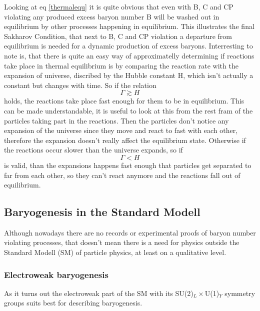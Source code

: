 Looking at eq \ref{thermalequ} it is quite obvious that even with B, C and CP violating any produced excess baryon number B will be washed out in equilibrium by other processes happening in equilibrium. \newline
This illustrates the final Sakharov Condition, that next to B, C and CP violation a departure from equilibrium is needed for a dynamic production of excess baryons. \newline
Interresting to note is, that there is quite an easy way of approximatelly determining if reactions take place in thermal equilibrium is by comparing the reaction rate with the expansion of universe, discribed by the Hubble constant H, which isn't actually a constant but changes with time. So if the relation 
\begin{equation}
	\Gamma\gtrsim H
	\label{rate_g_hubble}
\end{equation}
holds, the reactions take place fast enough for them to be in equilibrium. This can be made understandable, it is useful to look at this from the rest fram of the particles taking part in the reactions. Then the particles don't notice any expansion of the universe since they move and react to fast with each other, therefore the expansion doesn't really affect the equilibrium state. \newline
Otherwise if the reactions occur slower than the universe expands, so if 
\begin{equation}
	\Gamma<H
\end{equation}
is valid, than the expansions happens fast enough that particles get separated to far from each other, so they can't react anymore and the reactions fall out of equilibrium.
\subsection{Baryogenesis in the Standard Modell}
Although nowadays there are no records or experimental proofs of baryon number violating processes, that doesn't mean there is a need for physics outside the Standard Modell (SM) of particle physics, at least on a qualitative level.
\subsubsection{Electroweak baryogenesis}
As it turns out the electroweak part of the SM with its SU(2)$_L\times$U(1)$_Y$ symmetry groups suits best for describing baryogenesis. \newline
